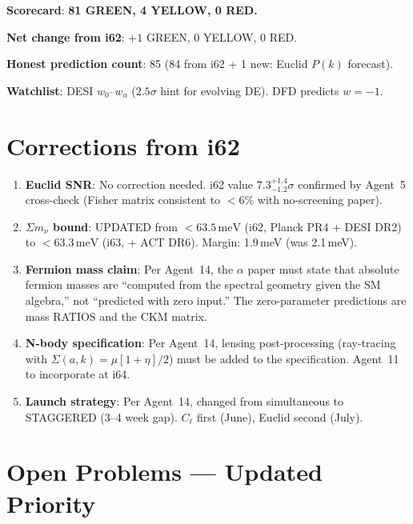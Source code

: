 \documentclass[11pt,a4paper]{article}
\newcommand{\GREEN}{\textcolor{dfdgreen}{\textbf{GREEN}}}
\newcommand{\YELLOW}{\textcolor{dfdyellow}{\textbf{YELLOW}}}
\newcommand{\RED}{\textcolor{dfdred}{\textbf{RED}}}
\begin{document}
\textbf{Scorecard}: \textbf{81 \GREEN, 4 \YELLOW, 0 \RED.}

\textbf{Net change from i62}: $+1$ GREEN, $0$ YELLOW, $0$ RED.

\textbf{Honest prediction count}: 85 (84 from i62 + 1 new: Euclid $P(k)$ forecast).

\textbf{Watchlist}: DESI $w_0$--$w_a$ ($2.5\sigma$ hint for evolving DE). DFD predicts $w = -1$.


\section{Corrections from i62}
\label{sec:corrections}

\begin{enumerate}
\item \textbf{Euclid SNR}: No correction needed. i62 value $7.3^{+1.4}_{-1.2}\sigma$ confirmed by Agent~5 cross-check (Fisher matrix consistent to $< 6\%$ with no-screening paper).

\item \textbf{$\Sigma m_\nu$ bound}: UPDATED from $< 63.5\,\mathrm{meV}$ (i62, Planck PR4 + DESI DR2) to $< 63.3\,\mathrm{meV}$ (i63, + ACT DR6). Margin: 1.9\,meV (was 2.1\,meV).

\item \textbf{Fermion mass claim}: Per Agent~14, the $\alpha$ paper must state that absolute fermion masses are ``computed from the spectral geometry given the SM algebra,'' not ``predicted with zero input.'' The zero-parameter predictions are mass RATIOS and the CKM matrix.

\item \textbf{N-body specification}: Per Agent~14, lensing post-processing (ray-tracing with $\Sigma(a,k) = \mu[1+\eta]/2$) must be added to the specification. Agent~11 to incorporate at i64.

\item \textbf{Launch strategy}: Per Agent~14, changed from simultaneous to STAGGERED (3--4 week gap). $C_\ell$ first (June), Euclid second (July).
\end{enumerate}


\section{Open Problems --- Updated Priority}
\label{sec:open}
\end{document}
